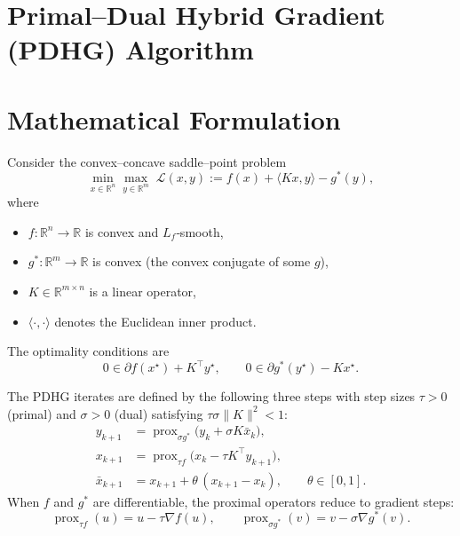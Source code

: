 \documentclass{article}
\begin{document}
\section*{Primal--Dual Hybrid Gradient (PDHG) Algorithm}

\section*{Mathematical Formulation}
Consider the convex–concave saddle–point problem
\[
\min_{x\in\mathbb{R}^n}\max_{y\in\mathbb{R}^m}\; \mathcal{L}(x,y)
:= f(x)+\langle Kx,y\rangle-g^{*}(y),
\]
where
\begin{itemize}
    \item $f:\mathbb{R}^{n}\rightarrow\mathbb{R}$ is convex and $L_f$‑smooth,
    \item $g^{*}:\mathbb{R}^{m}\rightarrow\mathbb{R}$ is convex (the convex conjugate of some $g$),
    \item $K\in\mathbb{R}^{m\times n}$ is a linear operator,
    \item $\langle\cdot,\cdot\rangle$ denotes the Euclidean inner product.
\end{itemize}
The optimality conditions are
\[
0\in \partial f(x^{\star})+K^{\top}y^{\star},\qquad
0\in \partial g^{*}(y^{\star})-Kx^{\star}.
\]

The PDHG iterates are defined by the following three steps with step sizes
$\tau>0$ (primal) and $\sigma>0$ (dual) satisfying $\tau\sigma\|K\|^{2}<1$:
\begin{subequations}\label{eq:pdhg}
\begin{align}
y_{k+1}&=\operatorname{prox}_{\sigma g^{*}}\!\bigl(y_{k}+\sigma K\bar{x}_{k}\bigr),\tag{1}\\[4pt]
x_{k+1}&=\operatorname{prox}_{\tau f}\!\bigl(x_{k}-\tau K^{\top}y_{k+1}\bigr),\tag{2}\\[4pt]
\bar{x}_{k+1}&=x_{k+1}+ \theta\,(x_{k+1}-x_{k}),\qquad \theta\in[0,1].\tag{3}
\end{align}
\end{subequations}
When $f$ and $g^{*}$ are differentiable, the proximal operators reduce to gradient steps:
\[
\operatorname{prox}_{\tau f}(u)=u-\tau\nabla f(u),\qquad
\operatorname{prox}_{\sigma g^{*}}(v)=v-\sigma\nabla g^{*}(v).
\]
\end{document}
